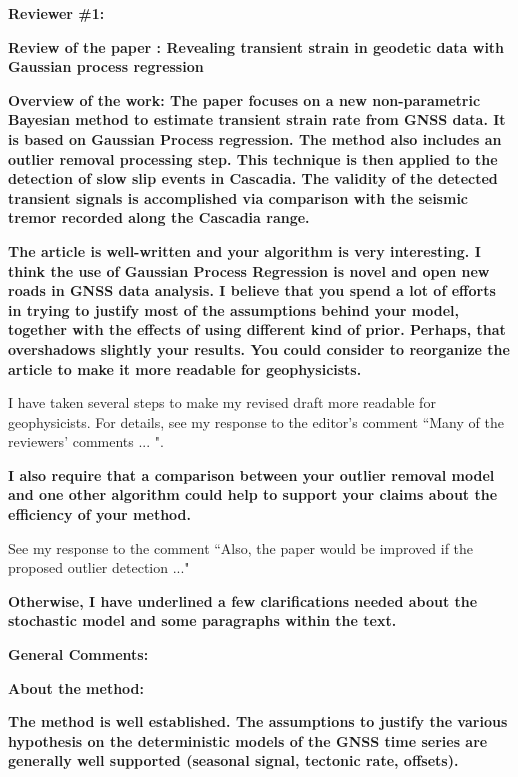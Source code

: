 \documentclass[10pt,a4paper]{letter}
\begin{document}
\begin{letter}{}

\textbf{Reviewer \#1:}\newline

\textbf{Review of the paper : Revealing transient strain in geodetic data
with Gaussian process regression}

\textbf{Overview of the work: The paper focuses on a new non-parametric
Bayesian method to estimate transient strain rate from GNSS data. It
is based on Gaussian Process regression. The method also includes an
outlier removal processing step. This technique is then applied to the
detection of slow slip events in Cascadia. The validity of the
detected transient signals is accomplished via comparison with the
seismic tremor recorded along the Cascadia range.}


\textbf{The article is well-written and your algorithm is very interesting. I
think the use of Gaussian Process Regression is novel and open new
roads in GNSS data analysis. I believe that you spend a lot of efforts
in trying to justify most of the assumptions behind your model,
together with the effects of using different kind of prior. Perhaps,
that overshadows slightly your results. You could consider to
reorganize the article to make it more readable for geophysicists.}

I have taken several steps to make my revised draft more readable for
geophysicists. For details, see my response to the editor's comment
``Many of the reviewers’ comments ... ".

\textbf{I also require that a comparison between your outlier removal model
and one other algorithm could help to support your claims about the
efficiency of your method.}

See my response to the comment ``Also, the paper would be improved if
the proposed outlier detection ..."

\textbf{Otherwise, I have underlined a few clarifications needed about the
stochastic model and some paragraphs within the text.}

\textbf{General Comments:}

\textbf{About the method:}

\textbf{The method is well established. The assumptions to justify the various
hypothesis on the deterministic models of the GNSS time series are
generally well supported (seasonal signal, tectonic rate, offsets).}


\end{letter}
\end{document}
